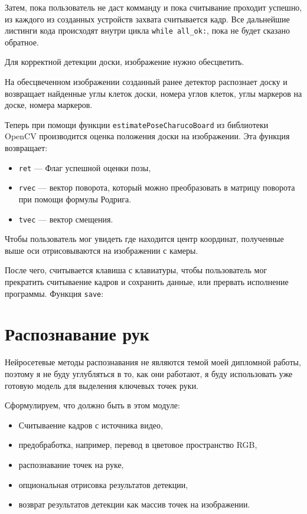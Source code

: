 \documentclass[12pt, a4paper]{article}
\begin{document}
Затем, пока пользователь не даст комманду и пока считывание проходит
успешно, из каждого из созданных устройств захвата считывается кадр. Все
дальнейшие листинги кода происходят внутри цикла \texttt{while all\_ok:}, пока не
будет сказано обратное.

Для корректной детекции доски, изображение нужно обесцветить.

На обесцвеченном изображении созданный ранее детектор распознает доску и
возвращает найденные углы клеток доски, номера углов клеток, углы маркеров
на доске, номера маркеров.

Теперь при помощи функции \texttt{estimatePoseCharucoBoard} из библиотеки
OpenCV производится оценка положения доски на изображении. Эта функция
возвращает:
\begin{itemize}
  \item \texttt{ret} --- Флаг успешной оценки позы,
  \item \texttt{rvec} --- вектор поворота, который можно преобразовать в
    матрицу поворота при помощи формулы Родрига.
  \item \texttt{tvec} --- вектор смещения.
\end{itemize}

Чтобы пользователь мог увидеть где находится центр координат, полученные
выше оси отрисовываются на изображении с камеры.

После чего, считывается клавиша с клавиатуры, чтобы пользователь мог
прекратить считываение кадров и сохранить данные, или прервать исполнение
программы.
Функция \texttt{save}:

\section{Распознавание рук}
Нейросетевые методы распознавания не являются темой моей дипломной работы,
поэтому я не буду углубляться в то, как они работают, я буду использовать уже
готовую модель для выделения ключевых точек руки.

Сформулируем, что должно быть в этом модуле:
\begin{itemize}
  \item Считываение кадров с источника видео,
  \item предобработка, например, перевод в цветовое пространство RGB,
  \item распознавание точек на руке,
  \item опциональная отрисовка результатов детекции,
  \item возврат результатов детекции как массив точек на изображении.
\end{itemize}
\end{document}
